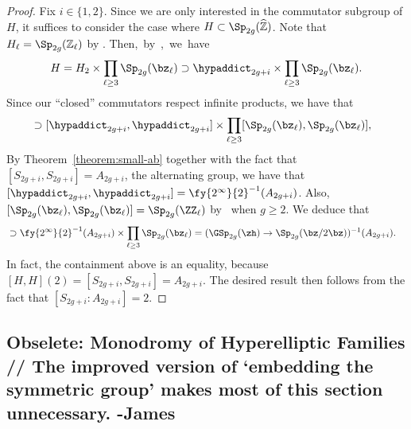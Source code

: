 \begin{proof} 
	Fix $i \in \{1, 2\}$. Since we are only interested in the commutator subgroup of $H$, it suffices to consider the case where $H \subset \Sp_{2g}(\widehat{\mathbb Z})$.
	Note that $H_\ell = \Sp_{2g}(\mathbb Z_\ell)$
	by \cite[Theorem 1]{landesman-swaminathan-tao-xu:lifting-symplectic-group}.
	\mbox{Then, by~\cite[Proposition 2.5]{landesman-swaminathan-tao-xu:rational-families}, we have}
	\begin{equation*}
		H = H_2 \times \prod_{\ell \ge 3} \Sp_{2g}(\bz_\ell) \supset \hypaddict_{2g+i} \times \prod_{\ell \ge 3} \Sp_{2g}(\bz_\ell).
	\end{equation*}
	Since our ``closed'' commutators respect infinite products, we have that 
    \begin{align*} 
    	[H, H] %
        &\supset [\hypaddict_{2g+i}, \hypaddict_{2g+i}] \times \prod_{\ell \ge 3} [\Sp_{2g}(\bz_\ell), \Sp_{2g}(\bz_\ell)], 
    \end{align*} 
    By Theorem~\ref{theorem:small-ab} together with the fact that $[S_{2g+i}, S_{2g+i}] = A_{2g+i}$, the alternating group, we have that $[\hypaddict_{2g+i}, \hypaddict_{2g+i}] = \fy{2^\infty}{2}^{-1}(A_{2g+i})$. Also, $[\Sp_{2g}(\bz_\ell), \Sp_{2g}(\bz_\ell)] = \Sp_{2g}(\ZZ_\ell)$ by~\cite[Proposition 3(a)]{landesman-swaminathan-tao-xu:lifting-symplectic-group} when $g \geq 2$. 
We deduce that
\begin{align*}
[H,H] &\supset \fy{2^\infty}{2}^{-1}(A_{2g+i}) \times \prod_{\ell \ge 3} \Sp_{2g}(\bz_\ell) = (\GSp_{2g}(\zh) \to \Sp_{2g}(\bz / 2 \bz))^{-1}(A_{2g+i}).
\end{align*}
In fact, the containment above is an equality, because
$\left[ H,H \right](2) = \left[ S_{2g+i}, S_{2g+i} \right] = A_{2g+i}$.
The desired result then follows from the fact that $[S_{2g+i} : A_{2g+i}] = 2$. 
\end{proof}

\subsection*{Obselete: Monodromy of Hyperelliptic Families // The improved version of `embedding the symmetric group' makes most of this section unnecessary. -James} \label{imtiredoflabellingthesethings}

